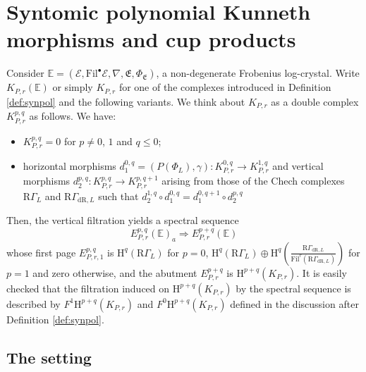 \documentclass[asterisque,english]{smfart}
\begin{document}
\section{Syntomic polynomial Kunneth morphisms and cup products}\label{SS PolyCup}

Consider $\mathbb{E}=\left( \mathcal{E},\mathrm{Fil}^{\bullet }
\mathcal{E},\nabla,\mathfrak{E},\Phi _{\mathfrak{E}}\right) 
$, a non-degenerate Frobenius log-crystal. Write $K_{P,r}(\mathbb{E})$ or simply $K_{P,r}$ for one of the complexes introduced in Definition \ref{def:synpol} and the following variants. We think about $K_{P,r}$ as a double complex $K_{P,r}^{p,q}$ as follows. We have:
\begin{itemize}
\item[i.] $K_{P,r}^{p,q}=0$ for $p\neq 0$, $1$ and $q\leq 0$;
\item[ii.] horizontal morphisms $d_1^{0,q}=(P(\Phi_L),\gamma)\colon K_{P,r}^{0,q}\rightarrow K_{P,r}^{1,q}$  and vertical morphisms $d_2^{p,q}\colon K_{P,r}^{p,q}\rightarrow K_{P,r}^{p,q+1}$ arising
from those of the Chech complexes $\mathrm{R}\Gamma _{L}$ and $\mathrm{R}\Gamma _{\mathrm{dR},L}$ such that $d_2^{1,q} \circ d_1^{0,q}  =d_1^{0,q+1}\circ d_2^{p,q}$
\end{itemize}
Then, the vertical filtration yields a spectral sequence
$$E_{P,r}^{p,q}\left( \mathbb{E}\right)_a \Longrightarrow
E_{P,r}^{p+q}\left( \mathbb{E}\right) \label{Poly F0}$$
whose first page $E_{P,r,1}^{p,q}$ is  $\mathrm{H}^{q}\left(\mathrm{R}\Gamma
_{L}\right) $ for $p=0$, $\mathrm{H}^{q}\left(\mathrm{R}\Gamma _{L}\right)
\oplus \mathrm{H}^{q}\left( \frac{\mathrm{R}\Gamma _{\mathrm{dR},L}}{\mathrm{
Fil}^{r}\left(\mathrm{R} \Gamma _{\mathrm{dR},L}\right) }\right) $ for $p=1$ and
zero otherwise, and the abutment $E_{P,r}^{p+q}$ is $\mathrm{H}^{p+q}(K_{P,r})$. It is easily checked that the filtration induced on $\mathrm{H}^{p+q}(K_{P,r})$  by the spectral sequence is described by $F^1 \mathrm{H}^{p+q}(K_{P,r})$ and $F^0 \mathrm{H}^{p+q}(K_{P,r})$  defined in the discussion after Definition \ref{def:synpol}.




\subsection{The setting}\label{sec:SS PolyCup Setting}
\end{document}
